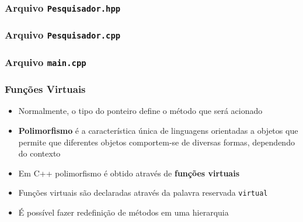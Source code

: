 \documentclass[aspectratio=169]{beamer}
\begin{document}
\begin{frame}[fragile]\frametitle{Arquivo \texttt{Pesquisador.hpp}}

\end{frame}

\begin{frame}[fragile]\frametitle{Arquivo \texttt{Pesquisador.cpp}}

\end{frame}

\begin{frame}[fragile]\frametitle{Arquivo \texttt{main.cpp}}

\end{frame}

\begin{frame}\frametitle{Funções Virtuais}
\begin{itemize}
	\item Normalmente, o tipo do ponteiro define o método que será acionado
	\item \textbf{Polimorfismo} é a característica única de linguagens orientadas a objetos que permite que diferentes objetos comportem-se de diversas formas, dependendo do contexto
	\item Em C++ polimorfismo é obtido através de \textbf{funções virtuais}
	\item Funções virtuais são declaradas através da palavra reservada \texttt{virtual}
	\item É possível fazer redefinição de métodos em uma hierarquia
\end{itemize}
\end{frame}
\end{document}
